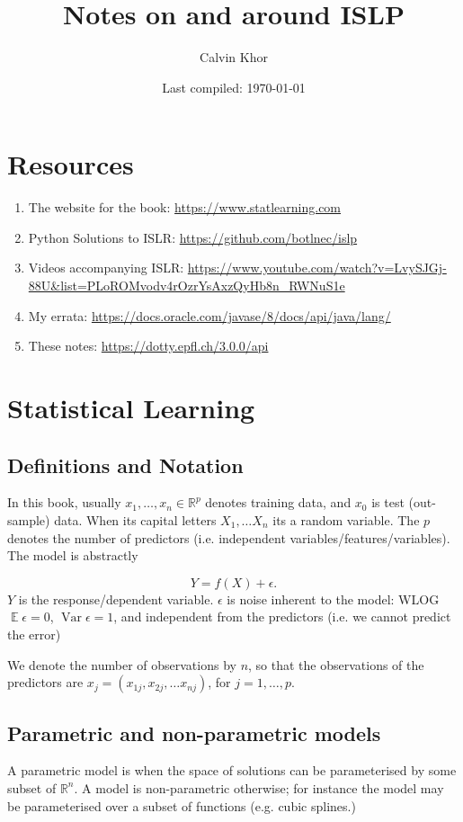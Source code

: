 \documentclass[11pt]{article}
\theoremstyle{definition}
\newcommand{\Var}{\operatorname{Var}}
\newcommand{\E}{\operatorname{\mathbb E}}
\newcommand{\R}{\mathbb R}
\begin{document}
\title{Notes on and around ISLP}
\author{Calvin Khor}

\date{Last compiled: \today}
\maketitle
\section{Resources}
\begin{enumerate}
	\item The website for the book: \url{https://www.statlearning.com} 
	\item Python Solutions to ISLR: \url{https://github.com/botlnec/islp}
	\item Videos accompanying ISLR: \url{https://www.youtube.com/watch?v=LvySJGj-88U&list=PLoROMvodv4rOzrYsAxzQyHb8n_RWNuS1e}
    \item My errata: \url{https://docs.oracle.com/javase/8/docs/api/java/lang/}
    \item These notes: \url{https://dotty.epfl.ch/3.0.0/api}
\end{enumerate}

\section{Statistical Learning}
\subsection{Definitions and Notation}

 In this book, usually $x_1,\dots,x_n \in \R^p$ denotes training data, and $x_0$ is test (out-sample) data. When its capital letters $X_1,\dots X_n$ its a random variable. The $p$ denotes the number of predictors (i.e. independent variables/features/variables). The model is abstractly

\[ Y=f(X)+\epsilon. \tag{2.1} \]
$Y$ is the response/dependent variable. $\epsilon$ is noise inherent to the model: WLOG $ \E\epsilon=0$,  $\Var\epsilon = 1$, and independent from the predictors (i.e. we cannot predict the error)

We denote the number of observations by $n$, so that the observations of the predictors are $x_j=(x_{1j}, x_{2j},\dots x_{nj})$, for $j=1,\dots,p$.

\subsection{Parametric and non-parametric models}
A parametric model is when the space of solutions can be parameterised by some subset of $\mathbb R^n$. A model is non-parametric otherwise; for instance the model may be parameterised over a subset of functions (e.g. cubic splines.)
\end{document}
